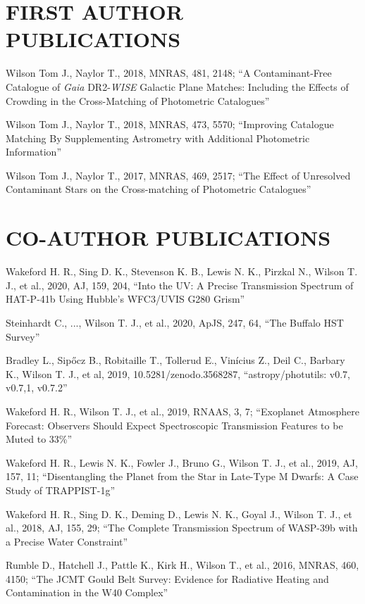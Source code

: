 \documentclass[letter, margin, 10pt]{res} %
\begin{document}
\begin{resume}
\section{FIRST AUTHOR PUBLICATIONS}

Wilson Tom J., Naylor T., 2018, MNRAS, 481, 2148; ``A Contaminant-Free Catalogue of \textit{Gaia} DR2-\textit{WISE} Galactic Plane Matches: Including the Effects of Crowding in the Cross-Matching of Photometric Catalogues''

Wilson Tom J., Naylor T., 2018, MNRAS, 473, 5570; ``Improving Catalogue Matching By Supplementing Astrometry with Additional Photometric Information''

Wilson Tom J., Naylor T., 2017, MNRAS, 469, 2517; ``The Effect of Unresolved Contaminant Stars on the Cross-matching of Photometric Catalogues''
\vspace{-5pt}
\section{CO-AUTHOR PUBLICATIONS}

Wakeford H. R., Sing D. K., Stevenson K. B., Lewis N. K., Pirzkal N., Wilson T. J., et al., 2020, AJ, 159, 204, ``Into the UV: A Precise Transmission Spectrum of HAT-P-41b Using Hubble's WFC3/UVIS G280 Grism''

Steinhardt C., ..., Wilson T. J., et al., 2020, ApJS, 247, 64, ``The Buffalo HST Survey''

Bradley L., Sip\H{o}cz B., Robitaille T., Tollerud E., Vinícius Z., Deil C., Barbary K., Wilson T. J., et al, 2019, 10.5281/zenodo.3568287, ``astropy/photutils: v0.7, v0.7,1, v0.7.2''

Wakeford H. R., Wilson T. J., et al., 2019, RNAAS, 3, 7; ``Exoplanet Atmosphere Forecast: Observers Should Expect Spectroscopic Transmission Features to be Muted to 33\%''

Wakeford H. R., Lewis N. K., Fowler J., Bruno G., Wilson T. J., et al., 2019, AJ, 157, 11; ``Disentangling the Planet from the Star in Late-Type M Dwarfs: A Case Study of TRAPPIST-1g''

Wakeford H. R., Sing D. K., Deming D., Lewis N. K., Goyal J., Wilson T. J., et al., 2018, AJ, 155, 29; ``The Complete Transmission Spectrum of WASP-39b with a Precise Water Constraint''

Rumble D., Hatchell J., Pattle K., Kirk H., Wilson T., et al., 2016, MNRAS, 460, 4150; ``The JCMT Gould Belt Survey: Evidence for Radiative Heating and Contamination in the W40 Complex''


\end{resume}
\end{document}
